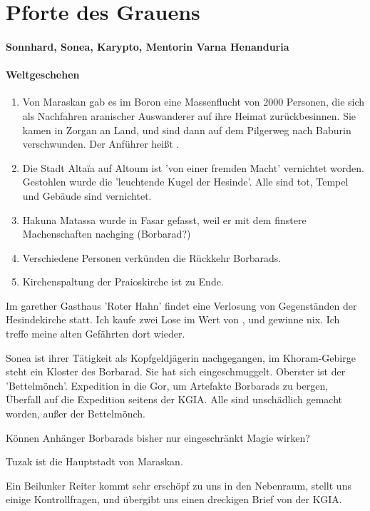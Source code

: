 \section{Pforte des Grauens}
\label{sec:pforten-des-grauens}
\paragraph{Sonnhard, Sonea, Karypto, Mentorin Varna Henanduria}
\paragraph{Weltgeschehen}
\label{sec:weltgeschehen}

\begin{enumerate}
\item Von Maraskan gab es im Boron eine Massenflucht von 2000 Personen, die sich als Nachfahren aranischer Auswanderer auf ihre Heimat zurückbesinnen. Sie kamen in Zorgan an Land, und sind dann auf dem Pilgerweg nach Baburin verschwunden. Der Anführer heißt . 
\item Die Stadt Alta\"ia auf Altoum ist 'von einer fremden Macht' vernichtet worden. Gestohlen wurde die 'leuchtende Kugel der Hesinde'. Alle sind tot, Tempel und Gebäude sind vernichtet.  
\item Hakuna Matassa wurde in Fasar gefasst, weil er mit dem finstere Machenschaften nachging (Borbarad?)
\item Verschiedene Personen verkünden die Rückkehr Borbarads. 
\item Kirchenspaltung der Praioskirche ist zu Ende.
\end{enumerate}

Im garether Gasthaus 'Roter Hahn' findet eine Verlosung von Gegenständen der Hesindekirche statt. Ich kaufe zwei Lose im Wert von ,
und gewinne nix. Ich treffe meine alten Gefährten dort wieder. 

Sonea ist ihrer Tätigkeit als Kopfgeldjägerin nachgegangen, im Khoram-Gebirge steht ein Kloster des Borbarad. Sie hat sich eingeschmuggelt. Oberster ist der 'Bettelmönch'. Expedition in die Gor, um Artefakte Borbarads zu bergen, Überfall auf die Expedition seitens der KGIA. Alle sind unschädlich gemacht worden, außer der Bettelmönch. 

Können Anhänger Borbarads bisher nur eingeschränkt Magie wirken?

Tuzak ist die Hauptstadt von Maraskan. 

Ein Beilunker Reiter kommt sehr erschöpf zu uns in den Nebenraum, stellt uns einige Kontrollfragen, und übergibt uns einen dreckigen Brief von der KGIA. 

